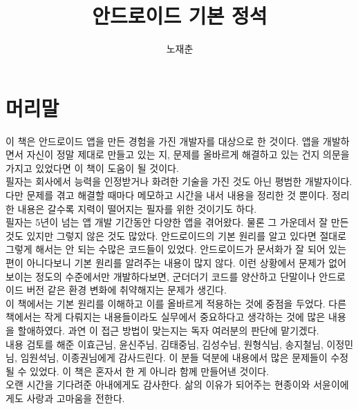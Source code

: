 \documentclass[a4paper,hidelinks,10pt,openany]{book} %
\title{안드로이드 기본 정석}
\author{노재춘}
\begin{document}

\maketitle
\chapter*{머리말}
이 책은 안드로이드 앱을 만든 경험을 가진 개발자를 대상으로 한 것이다. 
앱을 개발하면서 자신이 정말 제대로 만들고 있는 지, 문제를 올바르게 해결하고 있는 건지 의문을 가지고 있었다면 이 책이 도움이 될 것이다.\\

필자는 회사에서 능력을 인정받거나 화려한 기술을 가진 것도 아닌 평범한 개발자이다. 
다만 문제를 겪고 해결할 때마다 메모하고 시간을 내서 내용을 정리한 것 뿐이다.
정리한 내용은 갈수록 지력이 떨어지는 필자를 위한 것이기도 하다.\\

필자는 5년이 넘는 앱 개발 기간동안 다양한 앱을 겪어왔다. 물론 그 가운데서 잘 만든 것도 있지만 그렇지 않은 것도 많았다. 안드로이드의 기본 원리를 알고 있다면 절대로 그렇게 해서는 안 되는 수많은 코드들이 있었다. 
안드로이드가 문서화가 잘 되어 있는 편이 아니다보니 기본 원리를 알려주는 내용이 많지 않다. 이런 상황에서 문제가 없어보이는 정도의 수준에서만 개발하다보면, 군더더기 코드를 양산하고 단말이나 안드로이드 버전 같은 환경 변화에 취약해지는 문제가 생긴다.\\

이 책에서는 기본 원리를 이해하고 이를 올바르게 적용하는 것에 중점을 두었다. 
다른 책에서는 작게 다뤄지는 내용들이라도 실무에서 중요하다고 생각하는 것에 많은 내용을 할애하였다.
과연 이 접근 방법이 맞는지는 독자 여러분의 판단에 맡기겠다.\\

내용 검토를 해준 이효근님, 윤신주님, 김태중님, 김성수님, 원형식님, 송지철님, 이정민님, 임원석님, 이종권님에게 감사드린다. 이 분들 덕분에 내용에서 많은 문제들이 수정될 수 있었다. 이 책은 혼자서 한 게 아니라 함께 만들어낸 것이다.\\

오랜 시간을 기다려준 아내에게도 감사한다. 삶의 이유가 되어주는 현종이와 서윤이에게도 사랑과 고마움을 전한다.
\end{document}
